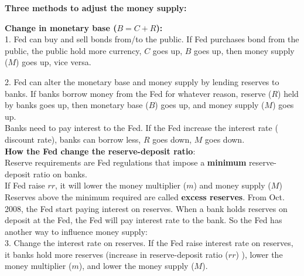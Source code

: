 \documentclass[12pt]{article}
\begin{document}
{\textbf {Three methods to adjust the money supply:}}

{\textbf {Change in monetary base ($ B = C + R $):}}\\
1. Fed can buy and sell bonds from/to the public. If Fed purchases bond from the
public, the public hold more currency, $ C $ goes up, $ B $ goes up, then money supply
($ M $) goes up, vice versa.

2. Fed can alter the monetary base and money supply by lending reserves to banks.
If banks borrow money from the Fed for whatever reason, reserve ($ R $) held by banks 
goes up, then monetary base ($ B $) goes up, and money supply ($ M $) goes up.\\
Banks need to pay interest to the Fed. If the Fed increase the interest rate (
discount rate), banks can borrow less, $ R $ goes down, $ M $ goes down.\\



{\textbf {How the Fed change the reserve-deposit ratio}}:\\
Reserve requirements are Fed regulations that impose a {\textbf {minimum}} 
reserve-deposit ratio on banks.\\
If Fed raise $ rr $, it will lower the money multiplier ($ m $) and money supply 
($ M $)\\
Reserves above the minimum required are called {\textbf {excess reserves}}.
From Oct. 2008, the Fed start paying interest on reserves. When a bank holds reserves
on deposit at the Fed, the Fed will pay interest rate to the bank. So the Fed has
another way to influence money supply:\\
3. Change the interest rate on reserves. If the Fed raise interest rate on reserves,
it banks hold more reserves (increase in reserve-deposit ratio ($ rr $)
), lower the money multiplier ($ m $), and lower the money supply ($ M $).
\end{document}
